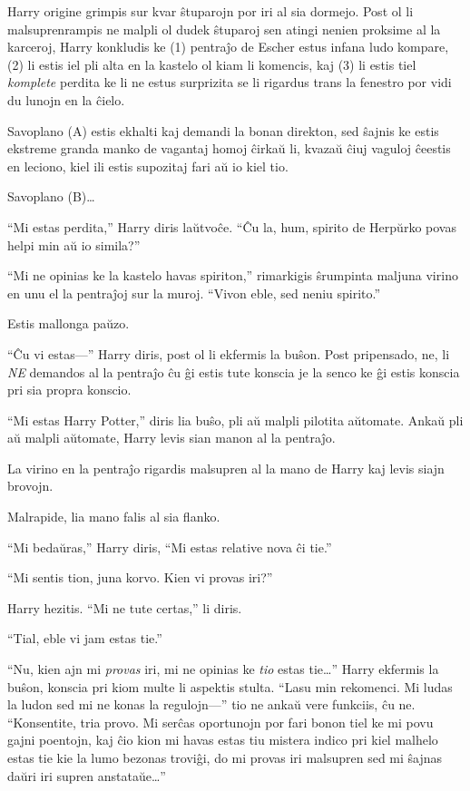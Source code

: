 Harry origine grimpis sur kvar ŝtuparojn por iri al sia dormejo. Post ol li
malsuprenrampis ne malpli ol dudek ŝtuparoj sen atingi nenien proksime al la
karceroj, Harry konkludis ke (1) pentraĵo de Escher estus infana ludo kompare,
(2) li estis iel pli alta en la kastelo ol kiam li komencis, kaj (3) li estis
tiel \emph{komplete} perdita ke li ne estus surprizita se li rigardus trans la
fenestro por vidi du lunojn en la ĉielo.

Savoplano (A) estis ekhalti kaj demandi la bonan direkton, sed ŝajnis ke estis
ekstreme granda manko de vagantaj homoj ĉirkaŭ li, kvazaŭ ĉiuj vaguloj ĉeestis
en leciono, kiel ili estis supozitaj fari aŭ io kiel tio.

Savoplano (B)\ldots

``Mi estas perdita,'' Harry diris laŭtvoĉe. ``Ĉu la, hum, spirito de
Herpŭrko povas helpi min aŭ io simila?''

``Mi ne opinias ke la kastelo havas spiriton,'' rimarkigis ŝrumpinta maljuna
virino en unu el la pentraĵoj sur la muroj. ``Vivon eble, sed neniu spirito.''

Estis mallonga paŭzo.

``Ĉu vi estas—'' Harry diris, post ol li ekfermis la buŝon. Post pripensado, ne,
li \emph{NE} demandos al la pentraĵo ĉu ĝi estis tute konscia je la senco ke ĝi
estis konscia pri sia propra konscio.

``Mi estas Harry Potter,'' diris lia buŝo, pli aŭ malpli pilotita aŭtomate. Ankaŭ pli aŭ
malpli aŭtomate, Harry levis sian manon al la pentraĵo.

La virino en la pentraĵo rigardis malsupren al la mano de Harry kaj levis siajn
brovojn.

Malrapide, lia mano falis al sia flanko.

``Mi bedaŭras,'' Harry diris, ``Mi estas relative nova ĉi tie.''

``Mi sentis tion, juna korvo. Kien vi provas iri?''

Harry hezitis. ``Mi ne tute certas,'' li diris.

``Tial, eble vi jam estas tie.''

``Nu, kien ajn mi \emph{provas} iri, mi ne opinias ke \emph{tio} estas tie\ldots''
Harry ekfermis la buŝon, konscia pri kiom multe li aspektis stulta. ``Lasu min
rekomenci. Mi ludas la ludon sed mi ne konas la regulojn—'' tio ne ankaŭ vere
funkciis, ĉu ne. ``Konsentite, tria provo. Mi serĉas oportunojn por fari bonon
tiel ke mi povu gajni poentojn, kaj ĉio kion mi havas estas tiu mistera
indico pri kiel malhelo estas tie kie la lumo bezonas troviĝi, do mi provas iri
malsupren sed mi ŝajnas daŭri iri supren anstataŭe\ldots''

